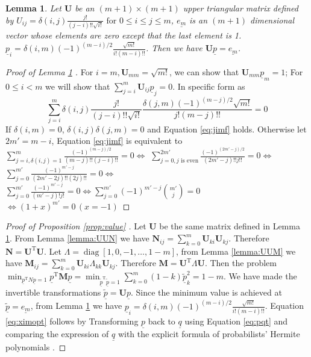 \documentclass[conference]{IEEEtran}
\newtheorem{lemma}{Lemma}
\def\T{\mathrm{T}}
\DeclareMathOperator*{\diag}{diag}
\begin{document}
\begin{lemma}\label{lemma:Upem}
Let $\mathbf{U}$ be an $(m+1) \times (m+1)$ upper triangular matrix defined by
$U_{ij} = \delta(i, j) \frac{j!}{(j-i)!!\sqrt{i!}} \textrm{ for } 0 \leq i\leq j \leq m$, $\underline{e_m}$ is an $(m+1)$ dimensional vector whose elements are zero except that the last element is 1. $\underline{p}_i = \delta(i, m) (-1)^{(m-i)/2}\frac{\sqrt{m!}}{i!(m-i)!!}$.
Then we have $ \mathbf{U} \underline{p} = \underline{e_m}$.
\end{lemma}
\begin{proof}[Proof of Lemma \ref{lemma:Upem} ]
    For $ i = m, \mathbf{U}_{mm} = \sqrt{m!}$, we can show that $\mathbf{U}_{mm} \underline{p}_m = 1 $; For $ 0\leq i < m $ we
    will show that $ \sum_{j=i}^m \mathbf{U}_{ij} \underline{p}_j = 0 $. In specific form as
    \begin{equation}\label{eq:jimf}
    \sum_{j=i}^m \delta(i, j) \frac{j!}{(j-i)!!\sqrt{i!}}  \frac{\delta(j, m)(-1)^{(m-j)/2}\sqrt{m!}}{j!(m-j)!!} = 0
    \end{equation}
    If $ \delta(i, m) = 0$, $\delta(i, j)\delta(j, m) = 0$ and Equation \eqref{eq:jimf} holds. Otherwise let $2m' = m - i$,    
    Equation \eqref{eq:jimf} is equivalent to
    $ \displaystyle\sum_{j=i, \delta(i,j)=1}^m  \frac{(-1)^{(m-j)/2}}{(m-j)!!(j-i)!!}  = 0  \iff  $
    $\displaystyle\sum_{j=0, j \textrm{ is even}}^{2m'}  \frac{(-1)^{(2m'-j)/2}}{(2m'-j)!! j!!}= 0  \iff $
    $\displaystyle\sum_{j=0}^{m'}  \frac{(-1)^{m'-j}}{(2m'-2j)!! (2j)!!} = 0  \iff $
    $\displaystyle\sum_{j=0}^{m'}  \frac{(-1)^{m'-j}}{(m'-j)! j!} = 0  \iff \displaystyle\sum_{j=0}^{m'} (-1)^{m'-j} \binom{m'}{j} = 0$
    $ \iff (1+x)^{m'} = 0 \,(x=-1)$
\end{proof}
\begin{proof}[Proof of Proposition \ref{prop:value} ]
    Let $\mathbf{U}$ be the same matrix defined in Lemma \ref{lemma:Upem}. From Lemma \ref{lemma:UUN} we have $\mathbf{N}_{ij} = \sum_{k=0}^m \mathbf{U}_{ki}\mathbf{U}_{kj}$. Therefore $\mathbf{N} = \mathbf{U}^\T\mathbf{U}$. Let $\Lambda = \diag[1, 0, -1, \dots, 1-m]$, from Lemma \ref{lemma:UUM} we have $\mathbf{M}_{ij} = \sum_{k=0}^m \mathbf{U}_{ki}\Lambda_{kk}\mathbf{U}_{kj}$. Therefore $\mathbf{M} = \mathbf{U}^\T\Lambda\mathbf{U}$. Then the problem $\min_{\underline{p}^\T N \underline{p} = 1} \underline{p}^\T \mathbf{M}\underline{p} = \min_{\underline{\tilde{p}}^\T\underline{\tilde{p}} = 1} \sum_{k=0}^m (1-k)\underline{\tilde{p}}_k^2 = 1-m$. We have made the invertible transformations $\underline{\tilde{p}} = \mathbf{U}\underline{p}$. Since the minimum value is achieved at $\underline{\tilde{p}} = \underline{e_m}$, from Lemma \ref{lemma:Upem} we have $\underline{p}_i = \delta(i, m) (-1)^{(m-i)/2}\frac{\sqrt{m!}}{i!(m-i)!!}$. Equation \eqref{eq:ximopt} follows by Transforming $\underline{p}$ back to $\underline{q}$ using Equation \eqref{eq:pqt} and comparing the expression of $\underline{q}$ with the explicit formula of probabilists' Hermite polynomials \cite[Eq. 18.5.13]{NIST:DLMF}.
\end{proof}
\end{document}
